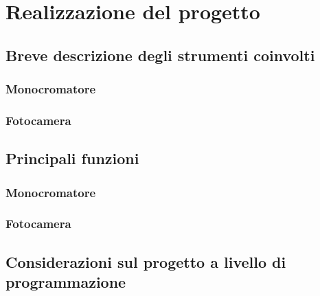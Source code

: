 \chapter{Realizzazione del progetto}

\lhead[\fancyplain{}{\bfseries\thepage}]{\fancyplain{}{\bfseries\rightmark}}

\section{Breve descrizione degli strumenti coinvolti}

\subsection{Monocromatore}
\subsection{Fotocamera}

\section{Principali funzioni}

\subsection{Monocromatore}
\subsection{Fotocamera}

\section{Considerazioni sul progetto a livello di programmazione}
